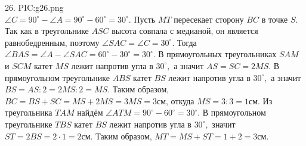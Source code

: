 26. {{PIC:g26.png}}\\
$\angle C=90^\circ-\angle A=90^\circ-60^\circ=30^\circ.$ Пусть $MT$ пересекает сторону $BC$ в точке $S.$ Так как в треугольнике $ASC$ высота совпала с медианой, он является равнобедренным, поэтому $\angle SAC=\angle C=30^\circ.$ Тогда $\angle BAS=\angle A-\angle SAC=60^\circ-30^\circ=30^\circ.$ В прямоугольных треугольниках $SAM$ и $SCM$ катет $MS$ лежит напротив угла в $30^\circ,$ а значит $AS=SC=2MS.$ В прямоугольном треугольнике $ABS$ катет $BS$ лежит напротив угла
в $30^\circ,$ а значит $BS=AS:2=2MS:2=MS.$ Таким образом, $BC=BS+SC=MS+2MS=3MS=3$см, откуда $MS=3:3=1$см. Из треугольника $TAM$ найдём $\angle ATM=90^\circ-60^\circ=30^\circ.$ В прямоугольном треугольнике $TBS$ катет $BS$ лежит напротив угла в $30^\circ,$ значит $ST=2BS=2\cdot1=2$см. Таким образом, $MT=MS+ST=1+2=3$см.\\
